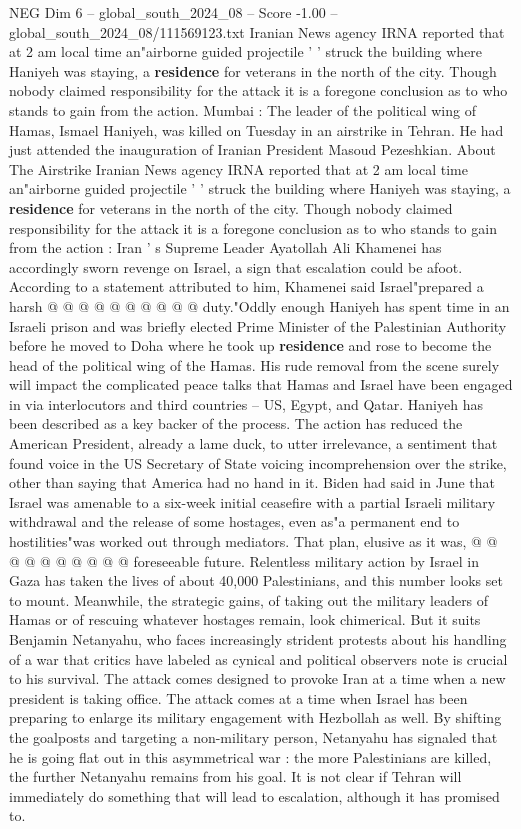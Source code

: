 \begin{textsample}{NEG Dim 6 – global\_south\_2024\_08 – Score -1.00 – global\_south\_2024\_08/111569123.txt}  \label{ex:f6_neg_131}
Iranian News agency IRNA reported that at 2 am local time an"airborne guided projectile ' ' struck the building where Haniyeh was staying, a \textbf{residence} for veterans in the north of the city.
Though nobody claimed responsibility for the attack it is a foregone conclusion as to who stands to gain from the action.
Mumbai : The leader of the political wing of Hamas, Ismael Haniyeh, was killed on Tuesday in an airstrike in Tehran.
He had just attended the inauguration of Iranian President Masoud Pezeshkian.
About The Airstrike Iranian News agency IRNA reported that at 2 am local time an"airborne guided projectile ' ' struck the building where Haniyeh was staying, a \textbf{residence} for veterans in the north of the city.
Though nobody claimed responsibility for the attack it is a foregone conclusion as to who stands to gain from the action : Iran ' s Supreme Leader Ayatollah Ali Khamenei has accordingly sworn revenge on Israel, a sign that escalation could be afoot.
According to a statement attributed to him, Khamenei said Israel"prepared a harsh @ @ @ @ @ @ @ @ @ @ duty."Oddly enough Haniyeh has spent time in an Israeli prison and was briefly elected Prime Minister of the Palestinian Authority before he moved to Doha where he took up \textbf{residence} and rose to become the head of the political wing of the Hamas.
His rude removal from the scene surely will impact the complicated peace talks that Hamas and Israel have been engaged in via interlocutors and third countries -- US, Egypt, and Qatar.
Haniyeh has been described as a key backer of the process.
The action has reduced the American President, already a lame duck, to utter irrelevance, a sentiment that found voice in the US Secretary of State voicing incomprehension over the strike, other than saying that America had no hand in it.
Biden had said in June that Israel was amenable to a six-week initial ceasefire with a partial Israeli military withdrawal and the release of some hostages, even as"a permanent end to hostilities"was worked out through mediators.
That plan, elusive as it was, @ @ @ @ @ @ @ @ @ @ foreseeable future.
Relentless military action by Israel in Gaza has taken the lives of about 40,000 Palestinians, and this number looks set to mount.
Meanwhile, the strategic gains, of taking out the military leaders of Hamas or of rescuing whatever hostages remain, look chimerical.
But it suits Benjamin Netanyahu, who faces increasingly strident protests about his handling of a war that critics have labeled as cynical and political observers note is crucial to his survival.
The attack comes designed to provoke Iran at a time when a new president is taking office.
The attack comes at a time when Israel has been preparing to enlarge its military engagement with Hezbollah as well.
By shifting the goalposts and targeting a non-military person, Netanyahu has signaled that he is going flat out in this asymmetrical war : the more Palestinians are killed, the further Netanyahu remains from his goal.
It is not clear if Tehran will immediately do something that will lead to escalation, although it has promised to.

\end{textsample}
